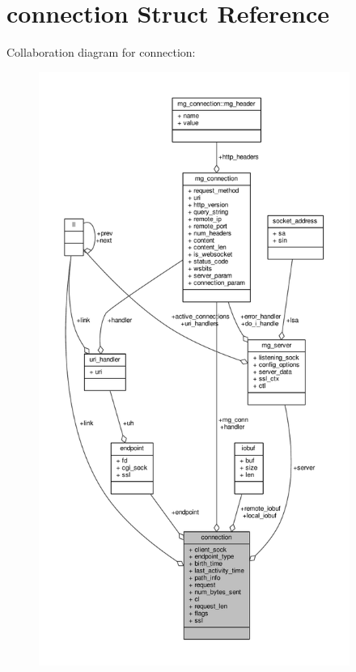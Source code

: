 \hypertarget{structconnection}{}\section{connection Struct Reference}
\label{structconnection}


Collaboration diagram for connection\+:
\nopagebreak
\begin{figure}[H]
\begin{center}
\leavevmode
\includegraphics[height=550pt]{df/de7/structconnection__coll__graph}
\end{center}
\end{figure}
